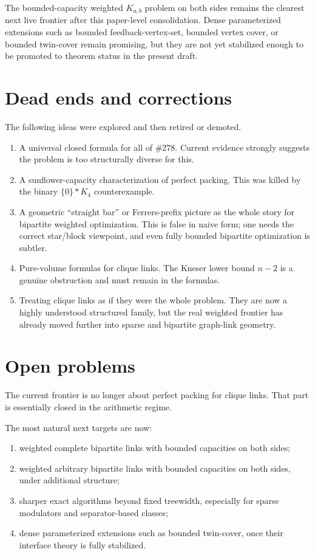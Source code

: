 \documentclass[11pt]{article}
\theoremstyle{definition}
\begin{document}
The bounded-capacity weighted \(K_{a,b}\) problem on both sides remains the clearest next live frontier after this paper-level consolidation. Dense parameterized extensions such as bounded feedback-vertex-set, bounded vertex cover, or bounded twin-cover remain promising, but they are not yet stabilized enough to be promoted to theorem status in the present draft.

\section{Dead ends and corrections}
The following ideas were explored and then retired or demoted.

\begin{enumerate}[label=(\arabic*)]
    \item A universal closed formula for all of \#278. Current evidence strongly suggests the problem is too structurally diverse for this.
    \item A sunflower-capacity characterization of perfect packing. This was killed by the binary \(\{0\}*K_4\) counterexample.
    \item A geometric ``straight bar'' or Ferrers-prefix picture as the whole story for bipartite weighted optimization. This is false in naive form; one needs the correct star/block viewpoint, and even fully bounded bipartite optimization is subtler.
    \item Pure-volume formulas for clique links. The Kneser lower bound \(n-2\) is a genuine obstruction and must remain in the formulas.
    \item Treating clique links as if they were the whole problem. They are now a highly understood structured family, but the real weighted frontier has already moved further into sparse and bipartite graph-link geometry.
\end{enumerate}

\section{Open problems}
The current frontier is no longer about perfect packing for clique links. That part is essentially closed in the arithmetic regime.

The most natural next targets are now:
\begin{enumerate}[label=(\arabic*)]
    \item weighted complete bipartite links with bounded capacities on both sides;
    \item weighted arbitrary bipartite links with bounded capacities on both sides, under additional structure;
    \item sharper exact algorithms beyond fixed treewidth, especially for sparse modulators and separator-based classes;
    \item dense parameterized extensions such as bounded twin-cover, once their interface theory is fully stabilized.
\end{enumerate}
\end{document}
